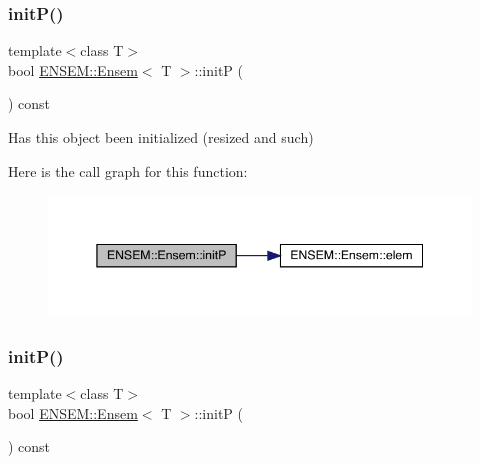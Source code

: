 \mbox{\label{classENSEM_1_1Ensem_af76aaa7b0f354006786dce06dc04669d}} 
\subsubsection{\texorpdfstring{initP()}{initP()}\hspace{0.1cm}{\footnotesize\ttfamily [1/2]}}
{\footnotesize\ttfamily template$<$class T$>$ \\
bool \mbox{\hyperlink{classENSEM_1_1Ensem}{E\+N\+S\+E\+M\+::\+Ensem}}$<$ T $>$\+::initP (\begin{DoxyParamCaption}{ }\end{DoxyParamCaption}) const\hspace{0.3cm}{\ttfamily [inline]}}



Has this object been initialized (resized and such) 

Here is the call graph for this function\+:
\nopagebreak
\begin{figure}[H]
\begin{center}
\leavevmode
\includegraphics[width=345pt]{d7/d3e/classENSEM_1_1Ensem_af76aaa7b0f354006786dce06dc04669d_cgraph}
\end{center}
\end{figure}
\mbox{\label{classENSEM_1_1Ensem_af76aaa7b0f354006786dce06dc04669d}} 
\subsubsection{\texorpdfstring{initP()}{initP()}\hspace{0.1cm}{\footnotesize\ttfamily [2/2]}}
{\footnotesize\ttfamily template$<$class T$>$ \\
bool \mbox{\hyperlink{classENSEM_1_1Ensem}{E\+N\+S\+E\+M\+::\+Ensem}}$<$ T $>$\+::initP (\begin{DoxyParamCaption}{ }\end{DoxyParamCaption}) const\hspace{0.3cm}{\ttfamily [inline]}}



